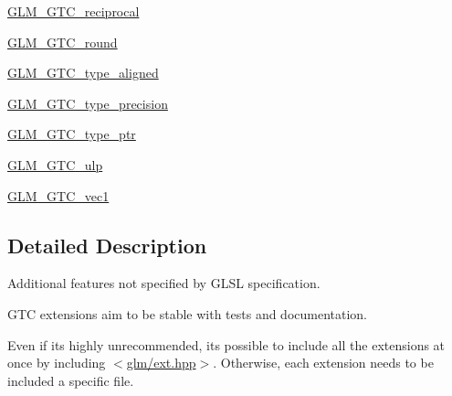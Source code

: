 \begin{DoxyCompactItemize}
\item 
\mbox{\hyperlink{group__gtc__reciprocal}{G\+L\+M\+\_\+\+G\+T\+C\+\_\+reciprocal}}
\item 
\mbox{\hyperlink{group__gtc__round}{G\+L\+M\+\_\+\+G\+T\+C\+\_\+round}}
\item 
\mbox{\hyperlink{group__gtc__type__aligned}{G\+L\+M\+\_\+\+G\+T\+C\+\_\+type\+\_\+aligned}}
\item 
\mbox{\hyperlink{group__gtc__type__precision}{G\+L\+M\+\_\+\+G\+T\+C\+\_\+type\+\_\+precision}}
\item 
\mbox{\hyperlink{group__gtc__type__ptr}{G\+L\+M\+\_\+\+G\+T\+C\+\_\+type\+\_\+ptr}}
\item 
\mbox{\hyperlink{group__gtc__ulp}{G\+L\+M\+\_\+\+G\+T\+C\+\_\+ulp}}
\item 
\mbox{\hyperlink{group__gtc__vec1}{G\+L\+M\+\_\+\+G\+T\+C\+\_\+vec1}}
\end{DoxyCompactItemize}


\subsection{Detailed Description}
Additional features not specified by G\+L\+SL specification. 

G\+TC extensions aim to be stable with tests and documentation.

Even if it\textquotesingle{}s highly unrecommended, it\textquotesingle{}s possible to include all the extensions at once by including $<$\mbox{\hyperlink{ext_8hpp}{glm/ext.\+hpp}}$>$. Otherwise, each extension needs to be included a specific file. 